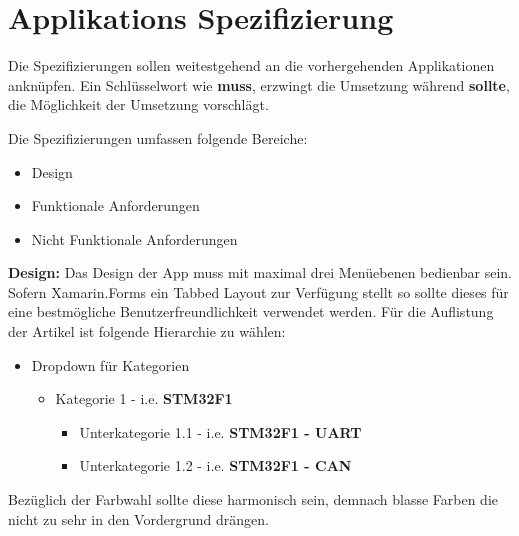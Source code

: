 	\newpage

\section{Applikations Spezifizierung}
\label{sec:mckspecs}

	Die Spezifizierungen sollen weitestgehend an die vorhergehenden Applikationen anknüpfen. Ein Schlüsselwort wie \textbf{muss}, erzwingt die Umsetzung während \textbf{sollte}, die Möglichkeit der Umsetzung vorschlägt.

	Die Spezifizierungen umfassen folgende Bereiche:
	\begin{itemize}
		\setlength\itemsep{0em}
		\item Design
		\item Funktionale Anforderungen
		\item Nicht Funktionale Anforderungen
	\end{itemize}

	\textbf{Design:} Das Design der App muss mit maximal drei Menüebenen bedienbar sein. Sofern Xamarin.Forms ein Tabbed Layout zur Verfügung stellt so sollte dieses für eine bestmögliche Benutzerfreundlichkeit verwendet werden. Für die Auflistung der Artikel ist folgende Hierarchie zu wählen:
	\begin{itemize}
		\setlength\itemsep{0em}
		\item Dropdown für Kategorien
		\begin{itemize}
			\setlength\itemsep{0em}
			\item Kategorie 1 - i.e. \textbf{STM32F1}
			\begin{itemize}
				\setlength\itemsep{0em}
				\item Unterkategorie 1.1 - i.e. \textbf{STM32F1 - UART}
				\item Unterkategorie 1.2 - i.e. \textbf{STM32F1 - CAN}
			\end{itemize}
		\end{itemize}
	\end{itemize}
	Bezüglich der Farbwahl sollte diese harmonisch sein, demnach blasse Farben die nicht zu sehr in den Vordergrund drängen.

